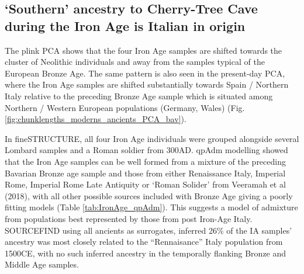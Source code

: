 \subsection{`Southern' ancestry to Cherry-Tree Cave during the Iron Age is Italian in origin}

The plink PCA shows that the four Iron Age samples are shifted towards the cluster of Neolithic individuals and away from the samples typical of the European Bronze Age. The same pattern is also seen in the present-day PCA, where the Iron Age samples are shifted substantially towards Spain / Northern Italy relative to the preceding Bronze Age sample which is situated among Northern / Western European populations (Germany, Wales) (Fig. \ref{fig:chunklengths_moderns_ancients_PCA_bav}). 

In fineSTRUCTURE, all four Iron Age individuals were grouped alongside several Lombard samples and a Roman soldier from 300AD. qpAdm modelling showed that the Iron Age samples can be well formed from a mixture of the preceding Bavarian Bronze age sample and those from either Renaissance Italy, Imperial Rome, Imperial Rome Late Antiquity or `Roman Solider' from Veeramah et al (2018), with all other possible sources included with Bronze Age giving a poorly fitting models (Table \ref{tab:IronAge_qpAdm}). This suggests a model of admixture from populations best represented by those from post Iron-Age Italy. SOURCEFIND using all ancients as surrogates, inferred 26\% of the IA samples' ancestry was most closely related to the ``Rennaisance'' Italy population from 1500CE, with no such inferred ancestry in the temporally flanking Bronze and Middle Age samples.


